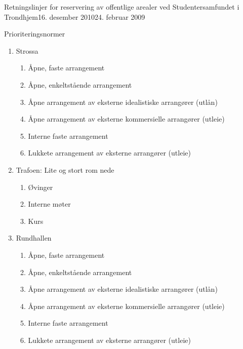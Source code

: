 \begin{instruks}{Retningslinjer for reservering av offentlige arealer
    ved Studentersamfundet i Trondhjem}{16. desember 2010}{24. februar 2009}
\begin{instruksledd}{Prioriteringsnormer}
\begin{enumerate}
\begin{enumerate}
\begin{enumerate}
                        \end{enumerate}
                        5 For eksempel stikkefest.
                    \item Strossa
                        \begin{enumerate}
                            \item  Åpne, faste arrangement
                            \item Åpne, enkeltstående arrangement
                            \item Åpne arrangement av eksterne idealistiske arrangører
                                (utlån)
                            \item Åpne arrangement av eksterne kommersielle arrangører
                                (utleie)
                            \item Interne faste arrangement
                            \item Lukkete arrangement av eksterne arrangører (utleie)
                        \end{enumerate}
                    \item Trafoen: Lite og stort rom nede
                        \begin{enumerate}
                            \item Øvinger
                            \item Interne møter
                            \item Kurs
                        \end{enumerate}
                    \item Rundhallen
                        \begin{enumerate}
                            \item Åpne, faste arrangement
                            \item Åpne, enkeltstående arrangement
                            \item Åpne arrangement av eksterne idealistiske arrangører (utlån)
                            \item Åpne arrangement av eksterne kommersielle arrangører (utleie)
                            \item Interne faste arrangement
                            \item Lukkete arrangement av eksterne arrangører (utleie)
                        \end{enumerate}
                \end{enumerate}
        \end{enumerate}
    \end{instruksledd}


\end{instruks}

